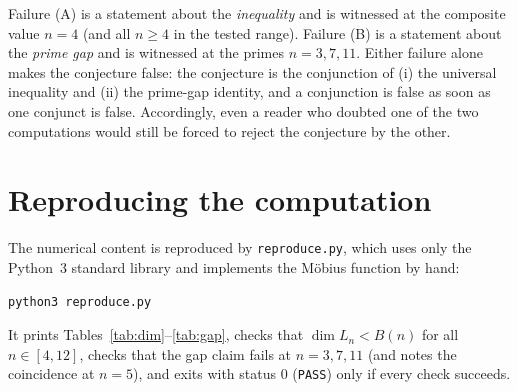 \documentclass[11pt]{article}
\theoremstyle{definition}
\theoremstyle{remark}
\begin{document}
Failure (A) is a statement about the \emph{inequality} and is witnessed at the
composite value $n = 4$ (and all $n \ge 4$ in the tested range). Failure (B) is a
statement about the \emph{prime gap} and is witnessed at the primes $n = 3,7,11$.
Either failure alone makes the conjecture false: the conjecture is the conjunction
of (i) the universal inequality and (ii) the prime-gap identity, and a conjunction
is false as soon as one conjunct is false. Accordingly, even a reader who doubted
one of the two computations would still be forced to reject the conjecture by the
other.

\section{Reproducing the computation}

The numerical content is reproduced by \texttt{reproduce.py}, which uses only the
Python~3 standard library and implements the Möbius function by hand:

\begin{verbatim}
python3 reproduce.py
\end{verbatim}

It prints Tables~\ref{tab:dim}--\ref{tab:gap}, checks that
$\dim L_n < B(n)$ for all $n \in [4,12]$, checks that the gap claim fails at
$n = 3,7,11$ (and notes the coincidence at $n = 5$), and exits with status $0$
(\texttt{PASS}) only if every check succeeds.
\end{document}
